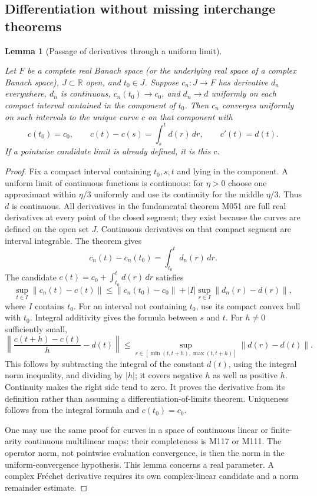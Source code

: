 \documentclass[11pt,a4paper]{article}
\newtheorem{lemma}[theorem]{Lemma}
\theoremstyle{definition}
\theoremstyle{remark}
\newcommand{\proofid}[1]{\par\smallskip{\normalfont\scriptsize\color{inkblue}Stable ID: \nolinkurl{#1}}\par\smallskip}
\begin{document}
\subsection{Differentiation without missing interchange theorems}

\begin{lemma}[Passage of derivatives through a uniform limit]
\label{bridge:uniform-derivatives}
\proofid{bridge:uniform-derivatives}
\par{}\par\smallskip
Let $F$ be a complete real Banach space (or the underlying real space of
a complex Banach space), $J\subset\mathbb R$ open, and $t_0\in J$.
Suppose $c_n:J\to F$ has derivative $d_n$ everywhere, $d_n$ is continuous,
$c_n(t_0)\to c_0$, and $d_n\to d$ uniformly on each compact interval
contained in the component of $t_0$. Then $c_n$ converges uniformly on
such intervals to the unique curve $c$ on that component with
\[
 c(t_0)=c_0,\qquad c(t)-c(s)=\int_s^t d(r)\,dr,
 \qquad c'(t)=d(t).
\]
If a pointwise candidate limit is already defined, it is this $c$.
\end{lemma}
\begin{proof}
Fix a compact interval containing $t_0,s,t$ and lying in the component.
A uniform limit of continuous functions is continuous: for $\eta>0$
choose one approximant within $\eta/3$ uniformly and use its continuity
for the middle $\eta/3$. Thus $d$ is continuous. All derivatives in the
fundamental theorem M051 are full real derivatives at every point of
the closed segment; they exist because the curves are defined on the
open set $J$. Continuous derivatives on that compact segment are
interval integrable. The theorem gives
\[
 c_n(t)-c_n(t_0)=\int_{t_0}^t d_n(r)\,dr.
\]
The candidate $c(t)=c_0+\int_{t_0}^t d(r)\,dr$ satisfies
\[
 \sup_{t\in I}\|c_n(t)-c(t)\|
 \leq\|c_n(t_0)-c_0\|+|I|\sup_{r\in I}\|d_n(r)-d(r)\|,
\]
where $I$ contains $t_0$. For an interval not containing $t_0$, use its
compact convex hull with $t_0$. Integral additivity gives the formula
between $s$ and $t$. For $h\ne0$ sufficiently small,
\[
 \left\|\frac{c(t+h)-c(t)}h-d(t)\right\|
 \leq\sup_{r\in[\min(t,t+h),\max(t,t+h)]}\|d(r)-d(t)\|.
\]
This follows by subtracting the integral of the constant $d(t)$,
using the integral norm inequality, and dividing by $|h|$; it covers
negative $h$ as well as positive $h$. Continuity makes the right side
tend to zero. It proves the derivative from its definition rather than
assuming a differentiation-of-limits theorem. Uniqueness follows from
the integral formula and $c(t_0)=c_0$.

One may use the same proof for curves in a space of continuous linear
or finite-arity continuous multilinear maps: their completeness is
M117 or M111. The operator norm, not pointwise evaluation convergence,
is then the norm in the uniform-convergence hypothesis. This lemma
concerns a real parameter. A complex Fr\'echet derivative requires its
own complex-linear candidate and a norm remainder estimate.
\end{proof}
\end{document}
